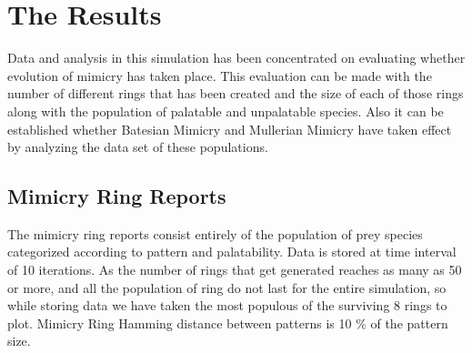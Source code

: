 \documentclass[letterpaper]{article}
\numberwithin{equation}{section}
\begin{document}
\section{The Results}
\label{section:results}

Data and analysis in this simulation has been concentrated on evaluating whether evolution of mimicry has taken place. This evaluation can be made with the number of different rings that has been created and the size of each of those rings along with the population of palatable and unpalatable species. Also it can be established whether Batesian Mimicry and Mullerian Mimicry have taken effect by analyzing the data set of these populations.

\subsection{Mimicry Ring Reports}
The mimicry ring reports consist entirely of the population of prey species categorized according to pattern and palatability. Data is stored at time interval of 10 iterations. As the number of rings that get generated reaches as many as 50 or more, and all the population of ring do not last for the entire simulation, so while storing data we have taken the most populous of the surviving 8 rings to plot. Mimicry Ring Hamming distance between patterns is 10 \% of the pattern size.
\end{document}
